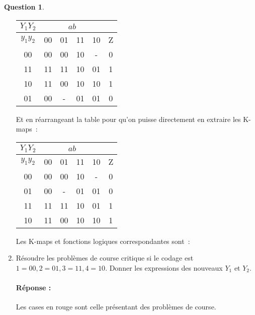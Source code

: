 \documentclass[11pt,a4paper]{article}
\theoremstyle{definition}%
\newtheorem{Q}{Question}[] %
\newcommand{\reponse}[1]{%
	\ifthenelse {\boolean{corrige}} {\paragraph{Réponse :} \color{darkblue}   #1\color{black}} {}
 }
\begin{document}
\begin{Q}
\begin{enumerate}
{		\begin{center}
			\begin{tabular}{|c|c|c|c|c|c|}\hline
			$Y_1Y_2$ & \multicolumn{4}{c|}{$ab$} & \\ \hline
			$y_1y_2$ & 00 & 01 & 11 & 10 & Z \\ \hline
			00       & 00 & 00 & 10 & -  & 0 \\ \hline
			11       & 11 & 11 & 10 & 01 & 1 \\ \hline
			10       & 11 & 00 & 10 & 10 & 1 \\ \hline
			01       & 00 & -  & 01 & 01 & 0 \\ \hline
			\end{tabular}
		\end{center}

		Et en réarrangeant la table pour qu'on puisse directement en extraire les K-maps~:
		\begin{center}
			\begin{tabular}{|c|c|c|c|c|c|}\hline
			$Y_1Y_2$ & \multicolumn{4}{c|}{$ab$} & \\ \hline
			$y_1y_2$ & 00 & 01 & 11 & 10 & Z \\ \hline
			00       & 00 & 00 & 10 & -  & 0 \\ \hline
			01       & 00 & -  & 01 & 01 & 0 \\ \hline
			11       & 11 & 11 & 10 & 01 & 1 \\ \hline
			10       & 11 & 00 & 10 & 10 & 1 \\ \hline
			\end{tabular}
		\end{center}

		Les K-maps et fonctions logiques correspondantes sont~:

		\begin{center}
		\end{center}

		\begin{center}
		\end{center}

		\begin{center}
		\end{center}
	}
	\item Résoudre les problèmes de course critique si le codage est $1=00, 2=01, 3=11, 4=10$.
	Donner les expressions des nouveaux $Y_1$ et $Y_2$.
	\reponse{
		Les cases en {\color{red}rouge} sont celle présentant des problèmes de course.

}
\end{enumerate}
\end{Q}
\end{document}
